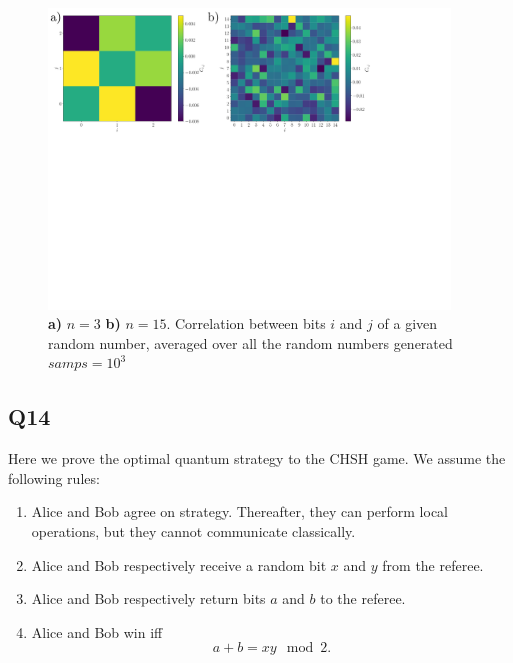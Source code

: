 \documentclass[12pt]{article}
\begin{document}
\begin{appendices}
\begin{figure}[htbp]
        \includegraphics[width=0.95\textwidth]{plot2.pdf}
       \caption{\label{FIG_02: Plot2} \textbf{a)} $n = 3$ \textbf{b)} $n = 15$. Correlation between bits $i$ and $j$ of a given random number, averaged over all the random numbers generated $samps = 10^3$} 
    \end{figure} 


\subsection*{Q14}


Here we prove the optimal quantum strategy to the CHSH game. We assume the following rules:
\begin{enumerate}
    \item Alice and Bob agree on strategy. Thereafter, they can perform local operations, but they cannot communicate classically.
    \item Alice and Bob respectively receive a random bit $x$ and $y$ from the referee.
    \item Alice and Bob respectively return bits $a$ and $b$ to the referee.
    \item Alice and Bob win iff
        \begin{equation}
            a + b = xy \mod 2.
            \label{eq:chsh-win-condition}
        \end{equation}
\end{enumerate}


\end{appendices}
\end{document}
